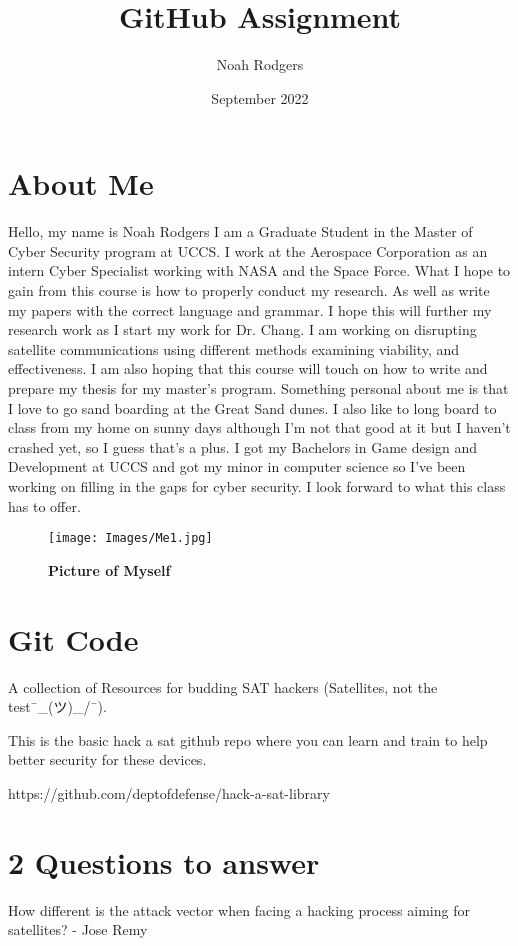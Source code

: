 
\title{GitHub Assignment}
\author{Noah Rodgers}
\date{September 2022}

%

\maketitle

\section{About Me}

Hello, my name is Noah Rodgers I am a Graduate Student in the Master of Cyber Security program at UCCS. I work at the Aerospace Corporation as an intern Cyber Specialist working with NASA and the Space Force. What I hope to gain from this course is how to properly conduct my research. As well as write my papers with the correct language and grammar. I hope this will further my research work as I start my work for Dr. Chang. I am working on disrupting satellite communications using different methods examining viability, and effectiveness. I am also hoping that this course will touch on how to write and prepare my thesis for my master’s program. Something personal about me is that I love to go sand boarding at the Great Sand dunes. I also like to long board to class from my home on sunny days although I’m not that good at it but I haven’t crashed yet, so I guess that’s a plus. I got my Bachelors in Game design and Development at UCCS and got my minor in computer science so I’ve been working on filling in the gaps for cyber security. I look forward to what this class has to offer.



\begin{figure}[!htb]
    \centering
    \texttt{[image: Images/Me1.jpg]}
    \caption{\textbf{Picture of Myself}}
    \label{fig:jamequation}
\end{figure}


\section{Git Code}
A collection of Resources for budding SAT hackers (Satellites, not the test¯\_(ツ)_/¯).

This is the basic hack a sat github repo where you can learn and train to help better security for these devices.

https://github.com/deptofdefense/hack-a-sat-library

\section{2 Questions to answer}
How different is the attack vector when facing a hacking process aiming for satellites? - Jose Remy






%
